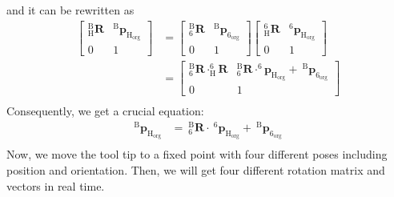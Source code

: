 and it can be rewritten as
\begin{equation}
\begin{split}																												
\begin{bmatrix}
_{\mathrm{H}}^{\mathrm{B}}\mathbf{R} & ^\mathrm{B}\!\boldsymbol{p}_\mathrm{H_{org}}\\ 
0 & 1
\end{bmatrix} &=
\begin{bmatrix}
_{\mathrm{6}}^{\mathrm{B}}\mathbf{R} & ^\mathrm{B}\!\boldsymbol{p}_\mathrm{6_{org}}\\ 
0 & 1
\end{bmatrix}
\begin{bmatrix}
_{\mathrm{H}}^{\mathrm{6}}\mathbf{R} & ^\mathrm{6}\!\boldsymbol{p}_\mathrm{H_{org}}\\ 
0 & 1
\end{bmatrix}\\
&= 
\begin{bmatrix}
_{\mathrm{6}}^{\mathrm{B}}\mathbf{R} \cdot _{\mathrm{H}}^{\mathrm{6}}\!\mathbf{R} & _{\mathrm{6}}^{\mathrm{B}}\mathbf{R} \cdot ^\mathrm{6}\!\!\boldsymbol{p}_\mathrm{H_{org}} +\ ^\mathrm{B}\!\boldsymbol{p}_\mathrm{6_{org}}\\ 
0 & 1
\end{bmatrix}\\
\end{split}
\end{equation}
Consequently, we get a crucial equation:
\begin{equation}
\begin{split}
^\mathrm{B}\!\boldsymbol{p}_\mathrm{H_{org}} &=\  _{\mathrm{6}}^{\mathrm{B}}\mathbf{R}\cdot\ ^\mathrm{6}\!\boldsymbol{p}_\mathrm{H_{org}} +\ ^\mathrm{B}\!\boldsymbol{p}_\mathrm{6_{org}}\\
\end{split}
\end{equation}
Now, we move the tool tip to a fixed point with four different poses including position and orientation. Then, we will get four different rotation matrix and vectors in real time. 
